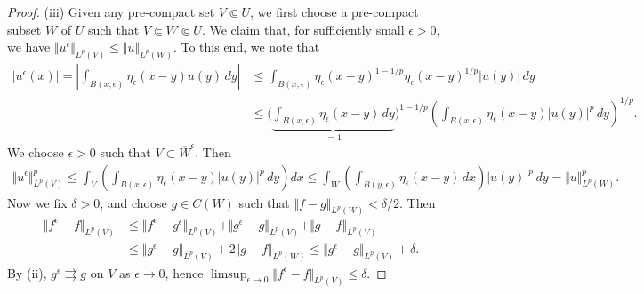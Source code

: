 \documentclass{article}
\numberwithin{equation}{section}
\theoremstyle{plain}
\theoremstyle{definition}
\begin{document}
\begin{proof}
(iii) Given any pre-compact set $V\Subset U$, we first choose a pre-compact subset $W$ of $U$ such that $V\Subset W\Subset U$. We claim that, for sufficiently small $\epsilon>0$, we have $\Vert u^\epsilon\Vert_{L^p(V)}\leq\Vert u\Vert_{L^p(W)}$. To this end, we note that
\begin{align*}
	\vert u^\epsilon(x)\vert=\left\vert\int_{B(x,\epsilon)}\eta_\epsilon(x-y)u(y)\,dy\right\vert&\leq\int_{B(x,\epsilon)}\eta_\epsilon(x-y)^{1-1/p}\eta_\epsilon(x-y)^{1/p}\vert u(y)\vert\,dy\\
	&\leq\biggl(\underbrace{\int_{B(x,\epsilon)}\eta_\epsilon(x-y)\,dy}_{=1}\biggr)^{1-1/p}\left(\int_{B(x,\epsilon)}\eta_\epsilon(x-y)\vert u(y)\vert^p\,dy\right)^{1/p}.
\end{align*}
We choose $\epsilon>0$ such that $V\subset\overline{W}^{\epsilon}$. Then
\begin{align*}
	\Vert u^\epsilon\Vert_{L^p(V)}^p\leq\int_V\left(\int_{B(x,\epsilon)}\eta_\epsilon(x-y)\vert u(y)\vert^p\,dy\right)dx\leq \int_W\left(\int_{B(y,\epsilon)}\eta_\epsilon(x-y)\,dx\right)\vert u(y)\vert^p\,dy=\Vert u\Vert_{L^p(W)}^p.
\end{align*}
Now we fix $\delta>0$, and choose $g\in C(W)$ such that $\Vert f-g\Vert_{L^p(W)}<\delta/2$. Then
\begin{align*}
	\Vert f^\epsilon-f\Vert_{L^p(V)}&\leq\Vert f^\epsilon-g^\epsilon\Vert_{L^p(V)}+\Vert g^\epsilon-g\Vert_{L^p(V)}+\Vert g-f\Vert_{L^p(V)}\\
	&\leq\Vert g^\epsilon-g\Vert_{L^p(V)}+2\Vert g-f\Vert_{L^p(W)}\leq\Vert g^\epsilon-g\Vert_{L^p(V)}+\delta.
\end{align*}
By (ii), $g^\epsilon\rightrightarrows g$ on $V$ as $\epsilon\to 0$, hence $\limsup_{\epsilon\to 0}\Vert f^\epsilon-f\Vert_{L^p(V)}\leq\delta$.
\end{proof}
\end{document}
